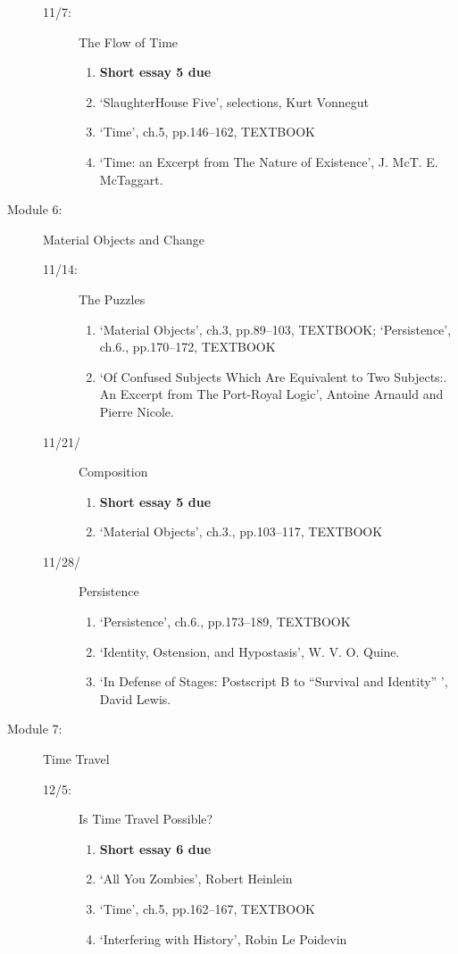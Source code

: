 \documentclass[article,oneside]{memoir}
\begin{document}
\begin{description}
\begin{description}
\item[11/7:] The Flow of Time
\begin{enumerate}
\item \textbf{Short essay 5 due}
\item `SlaughterHouse Five', selections, Kurt Vonnegut
\item `Time', ch.5, pp.146--162, TEXTBOOK
\item `Time: an Excerpt from The Nature of Existence', J. McT. E. McTaggart.
\end{enumerate}
\end{description}

\item[Module 6:] Material Objects and Change
\begin{description}
\item[11/14:] The Puzzles 
\begin{enumerate}
\item `Material Objects', ch.3, pp.89--103, TEXTBOOK; `Persistence', ch.6., pp.170--172, TEXTBOOK
\item `Of Confused Subjects Which Are Equivalent to Two Subjects:. An Excerpt from The Port-Royal Logic', Antoine Arnauld and Pierre Nicole. 
\end{enumerate}
\item[11/21/] Composition 
\begin{enumerate}
\item \textbf{Short essay 5 due}
\item `Material Objects', ch.3., pp.103--117, TEXTBOOK
\end{enumerate}
\item[11/28/] Persistence
\begin{enumerate}
\item `Persistence', ch.6., pp.173--189, TEXTBOOK
 \item `Identity, Ostension, and Hypostasis', W. V. O. Quine.
\item `In Defense of Stages: Postscript B to ``Survival and Identity'' ', David Lewis.
\end{enumerate}
\end{description}
\item[Module 7:] Time Travel
\begin{description}
\item[12/5:] Is Time Travel Possible?
\begin{enumerate}
\item \textbf{Short essay 6 due}
\item `All You Zombies', Robert Heinlein 
\item `Time', ch.5, pp.162--167, TEXTBOOK
\item `Interfering with History', Robin Le Poidevin 
\end{enumerate}


\end{description}
\end{description}
\end{document}
